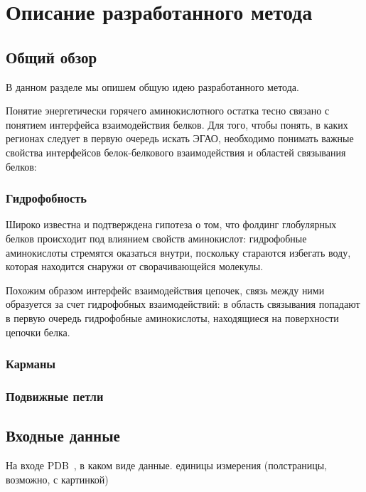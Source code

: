 \graphicspath{{../images/algorithm/}}
\chapter{Описание разработанного метода}

\section{Общий обзор}
В данном разделе мы опишем общую идею разработанного метода.

Понятие энергетически горячего аминокислотного остатка тесно связано с понятием интерфейса взаимодействия белков. Для того, чтобы понять, в каких регионах следует в первую очередь искать ЭГАО, необходимо понимать важные свойства интерфейсов белок-белкового взаимодействия и областей связывания белков:

\subsection{Гидрофобность}
Широко известна и подтверждена гипотеза о том, что фолдинг глобулярных белков происходит под влиянием свойств аминокислот: гидрофобные аминокислоты стремятся оказаться внутри, поскольку стараются избегать воду, которая находится снаружи от сворачивающейся молекулы.

Похожим образом интерфейс взаимодействия цепочек, связь между ними образуется за счет гидрофобных взаимодействий: в область связывания попадают в первую очередь гидрофобные аминокислоты, находящиеся на поверхности цепочки белка.

\subsection{Карманы}
\subsection{Подвижные петли}



\section{Входные данные}
На входе PDB~\cite{pdb}, в каком виде данные. единицы измерения
(полстраницы, возможно, с картинкой)
\vspace{10cm}

